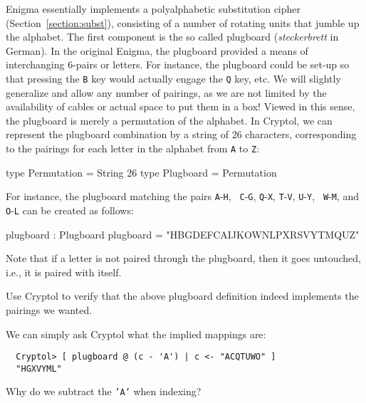 Enigma essentially implements a polyalphabetic substitution cipher
(Section~\ref{section:subst})\indPolyAlphSubst, consisting of a number
of rotating units that jumble up the alphabet.  The first component is
the so called plugboard ({\em steckerbrett} in
German)\indEnigmaPlugboard. In the original Enigma, the plugboard
provided a means of interchanging 6-pairs or letters. For instance,
the plugboard could be set-up so that pressing the {\tt B} key would
actually engage the {\tt Q} key, etc.  We will slightly generalize and
allow any number of pairings, as we are not limited by the
availability of cables or actual space to put them in a box! Viewed in
this sense, the plugboard is merely a permutation of the alphabet. In
Cryptol, we can represent the plugboard combination by a string of 26
characters, corresponding to the pairings for each letter in the
alphabet from {\tt A} to {\tt Z}:

\begin{code}
  type Permutation = String 26
  type Plugboard = Permutation
\end{code}
For instance, the plugboard matching the pairs {\tt A}-{\tt H}, {\tt
  C}-{\tt G}, {\tt Q}-{\tt X}, {\tt T}-{\tt V}, {\tt U}-{\tt Y}, {\tt
  W}-{\tt M}, and {\tt O}-{\tt L} can be created as follows:
\begin{code}
  plugboard : Plugboard
  plugboard = "HBGDEFCAIJKOWNLPXRSVYTMQUZ"
\end{code}
Note that if a letter is not paired through the plugboard, then it
goes untouched, i.e., it is paired with itself.

\begin{Exercise}\label{ex:enigma:1}
  Use Cryptol to verify that the above plugboard definition indeed
  implements the pairings we wanted.
\end{Exercise}
\begin{Answer}
We can simply ask Cryptol what the implied mappings are:
\begin{Verbatim}
  Cryptol> [ plugboard @ (c - 'A') | c <- "ACQTUWO" ]
  "HGXVYML"
\end{Verbatim}
Why do we subtract the {\tt 'A'} when indexing?
\end{Answer}



